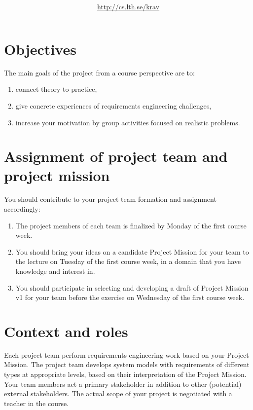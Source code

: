 \documentclass{project}
\title{\bf\sffamily\fontsize{18}{18}\selectfont{
Project~Description~\COURSECODE\\\COURSETITLE
}}
\author{\url{http://cs.lth.se/krav}}
\date{\sffamily\fontsize{10}{10}\selectfont{Revision date: \today}}
\begin{document}
\maketitle
\vspace{-1cm}

\section{Objectives}
The main goals of the project from a course perspective are to:
\begin{enumerate}[nolistsep]
\item connect theory to practice,
\item give concrete experiences of requirements engineering challenges,
\item increase your motivation by group activities focused on realistic problems.
\end{enumerate}

\section{Assignment of project team and project mission}
You should contribute to your project team formation and assignment accordingly:
\begin{enumerate}[nolistsep]
\item The project members of each team is finalized by Monday of the first course week. 
\item You should bring your ideas on a candidate Project Mission for your team to the lecture on Tuesday of the first course week, in a domain that you have knowledge and interest in.
\item You should participate in selecting and developing a draft of Project Mission v1 for your team before the exercise on Wednesday of the first course week.   
\end{enumerate}

\section{Context and roles}

\noindent Each project team perform requirements engineering work based on your Project Mission. The project team develops system models with requirements of different types at appropriate levels, based on their interpretation of the Project Mission. Your team members act a primary stakeholder in addition to other (potential) external stakeholders. The actual scope of your project is negotiated with a teacher in the course.
\end{document}
